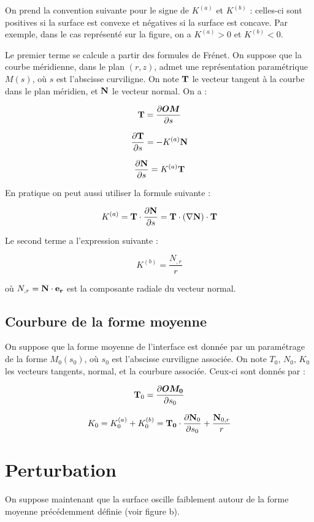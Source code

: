 On prend la convention suivante pour le signe de $K^{(a)}$ et  $K^{(b)}$ :
celles-ci sont positives si la surface est convexe et négatives si la surface est concave. Par exemple, dans le cas représenté sur la figure, on a $K^{(a)}>0$ et  $K^{(b)}<0$.


Le premier terme se calcule a partir des formules de Frénet.
On suppose que la courbe méridienne, dans le plan $(r,z)$, admet une représentation paramétrique $M(s)$, où $s$ est l'abscisse curviligne. On note $\bf T$ le vecteur tangent à la courbe dans le plan méridien, et $\bf N$ le vecteur normal. On a : 

$$
{\bf T} = \DP{\vec{OM}}{s}
$$




$$
\frac{\partial {\bf T}}{\partial s} = - K^{(a)} {\bf N}
$$

$$
\frac{\partial {\bf N}}{\partial s} = K^{(a)} {\bf T}
$$

En pratique on peut aussi utiliser la formule suivante :

$$
K^{(a)} =  {\bf T} \cdot \frac{\partial {\bf N}}{\partial s} =   {\bf T} \cdot (\nabla {\bf N}) \cdot {\bf T} 
$$


Le second terme a l'expression suivante :

$$
K^{(b)} =  \frac{ N_{,r}}{r}
$$

où $N_{,r} = {\bf N} \cdot {\bf e_r}$ est la composante radiale du vecteur normal.

\subsection{Courbure de la forme moyenne}

On suppose que la forme moyenne de l'interface est donnée par un paramétrage de la forme $M_0(s_0)$, où $s_0$ est l'abscisse curviligne associée. On note $T_0$, $N_0$, $K_0$ les vecteurs tangents, normal, et la courbure associée. Ceux-ci sont donnés par :

$$
{\bf T}_0 = \DP{\vec{OM_0}}{s_0}
$$


\begin{equation}
K_0 = K_0^{(a)} + K_0^{(b)} =  {\bf T_0} \cdot \frac{\partial {\bf N}_0}{\partial s_0} 
+ \frac{{\bf N}_{0,r}}{r}
\end{equation}

\section{Perturbation}

On suppose maintenant que la surface oscille faiblement autour de la forme moyenne précédemment définie (voir figure b).

